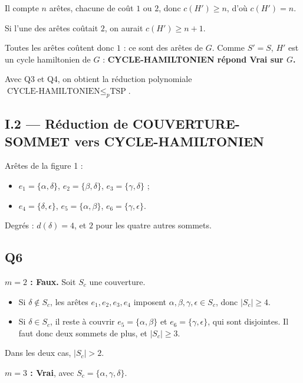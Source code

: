 \documentclass[11pt,a4paper]{article}
\providecommand{\tightlist}{\setlength{\itemsep}{0pt}\setlength{\parskip}{0pt}}
\begin{document}
Il compte \(n\) arêtes, chacune de coût \(1\) ou \(2\), donc \(c(H')\ge n\), d'où \(c(H')=n\).

Si l'une des arêtes coûtait \(2\), on aurait \(c(H')\ge n+1\).

Toutes les arêtes coûtent donc \(1\) : ce sont des arêtes de \(G\). Comme \(S'=S\), \(H'\) est un cycle hamiltonien de \(G\) : \textbf{CYCLE-HAMILTONIEN répond Vrai sur \(G\).}

Avec Q3 et Q4, on obtient la réduction polynomiale \(\text{CYCLE-HAMILTONIEN}\le_p\text{TSP}\).

\hypertarget{i.2-ruxe9duction-de-couverture-sommet-vers-cycle-hamiltonien}{%
\subsection{I.2 --- Réduction de COUVERTURE-SOMMET vers CYCLE-HAMILTONIEN}\label{i.2-ruxe9duction-de-couverture-sommet-vers-cycle-hamiltonien}}

Arêtes de la figure 1 :

\begin{itemize}
\tightlist
\item
  \(e_1=\{\alpha,\delta\}\), \(e_2=\{\beta,\delta\}\), \(e_3=\{\gamma,\delta\}\) ;
\item
  \(e_4=\{\delta,\epsilon\}\), \(e_5=\{\alpha,\beta\}\), \(e_6=\{\gamma,\epsilon\}\).
\end{itemize}

Degrés : \(d(\delta)=4\), et \(2\) pour les quatre autres sommets.

\hypertarget{q6}{%
\subsection{Q6}\label{q6}}

\textbf{\(m=2\) : Faux.} Soit \(S_c\) une couverture.

\begin{itemize}
\tightlist
\item
  Si \(\delta\notin S_c\), les arêtes \(e_1,e_2,e_3,e_4\) imposent \(\alpha,\beta,\gamma,\epsilon\in S_c\), donc \(|S_c|\ge 4\).
\item
  Si \(\delta\in S_c\), il reste à couvrir \(e_5=\{\alpha,\beta\}\) et \(e_6=\{\gamma,\epsilon\}\), qui sont disjointes. Il faut donc deux sommets de plus, et \(|S_c|\ge 3\).
\end{itemize}

Dans les deux cas, \(|S_c|>2\).

\textbf{\(m=3\) : Vrai}, avec \(S_c=\{\alpha,\gamma,\delta\}\).
\end{document}
